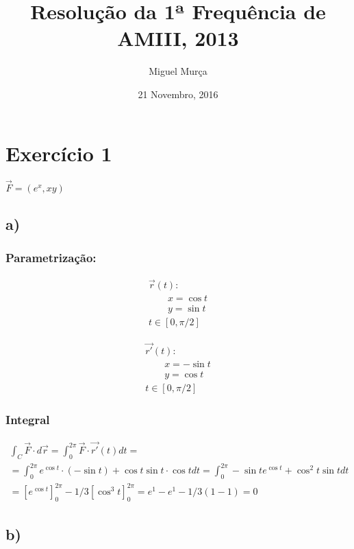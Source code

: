 \documentclass{article}
\title{Resolução da 1ª Frequência de AMIII, 2013}
\author{Miguel Murça}
\date{21 Novembro, 2016}
\newcommand{\dr}[0]{d \vec{r}}
\newcommand{\vF}[0]{\vec{F}}
\newcommand{\sqrBrkts}[1]{\left[#1\right]}
\begin{document}
\maketitle
\section{Exercício 1}

\begin{center}
$ \vF = (e^x, xy)$
\end{center}

\subsection*{a)}

\subsubsection*{Parametrização:}

\begin{gather*}
\vec{r}(t): \\
\qquad x = \cos t\\
\qquad y = \sin t\\
t \in [0, \pi/2]
\end{gather*}

\begin{gather*}
\vec{r'}(t):\\
\qquad x = -\sin t\\
\qquad y = \cos t\\
t \in [0, \pi/2]
\end{gather*}

\subsubsection*{Integral}

\begin{gather*}
\int_C \vF{} \cdot \dr = \int_0^{2 \pi} \vF \cdot \vec{r'}(t) dt =\\
= \int_0^{2\pi} e^{\cos t} \cdot (- \sin t) + \cos t \sin t \cdot \cos t dt = \int_0^{2 \pi} - \sin t e^{\cos t} + \cos^2 t \sin t dt\\
= \sqrBrkts{e^{\cos t}}_0^{2\pi} - 1/3 \sqrBrkts{\cos^3 t}_0^{2\pi} = e^1 - e^1 - 1/3 (1 - 1) = 0
\end{gather*}

\subsection*{b)}
\end{document}
